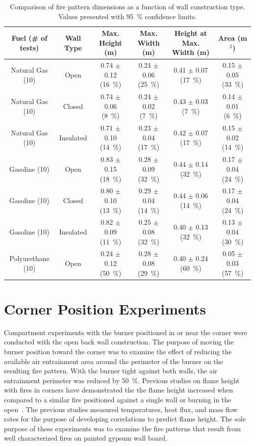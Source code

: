 \documentclass[twoside]{uocthesis}
\begin{document}
{\begin{table}
	\centering
	\footnotesize
	\begin{tabular}{|c|c|c|c|c|c|}
	\hline
	Fuel (\# of tests)      &   Wall Type   &   Max. Height (m)	         & Max. Width (m)               &  Height at Max. Width (m) &  Area (m$^2$)  \\ \hline 
		Natural Gas (10)    &   Open 		& 0.74 	$\pm$ 0.12 (16~\%)   &	0.24 $\pm$ 0.06 (25~\%) 	& 0.41 $\pm$ 0.07 (17~\%)	& 0.15 $\pm$ 0.05 (33~\%) 	\\
		Natural Gas (10)    &   Closed 		& 0.74	$\pm$ 0.06 (8~\%)    &	0.24 $\pm$ 0.02 (7~\%) 		& 0.43 $\pm$ 0.03 (7~\%)  	& 0.14 $\pm$ 0.01 (6~\%) 	\\
		Natural Gas (10)    &   Insulated 	& 0.71	$\pm$ 0.10 (14~\%)   &	0.23 $\pm$ 0.04 (17~\%) 	& 0.42 $\pm$ 0.07 (17~\%) 	& 0.15 $\pm$ 0.02 (14~\%)  	\\
		Gasoline (10)       &   Open    	& 0.83	$\pm$ 0.15 (18~\%)   &	0.28 $\pm$ 0.09 (32~\%) 	& 0.44 $\pm$ 0.14 (32~\%) 	& 0.17 $\pm$ 0.04 (24~\%)  	\\
		Gasoline (10)       &   Closed  	& 0.80	$\pm$ 0.10 (13~\%)   &	0.29 $\pm$ 0.04 (14~\%) 	& 0.44 $\pm$ 0.06 (14~\%) 	& 0.17 $\pm$ 0.04 (24~\%)  	\\
		Gasoline (10)       &   Insulated	& 0.82 	$\pm$ 0.09 (11~\%)   &	0.25 $\pm$ 0.08 (32~\%) 	& 0.40 $\pm$ 0.13 (32~\%) 	& 0.13 $\pm$ 0.04 (30~\%)  	\\
		Polyurethane (10)	&   Open 		& 0.24  $\pm$ 0.12 (50~\%) 	 &  0.28 $\pm$ 0.08 (29~\%) 	& 0.40 $\pm$ 0.24 (60~\%)   & 0.05 $\pm$ 0.03 (57~\%)   \\
		\hline
	\end{tabular}
	\caption[Comparison of fire pattern dimensions as a function of wall construction type]{Comparison of fire pattern dimensions as a function of wall construction type. Values presented with 95~\% confidence limits.}
	\label{tab:Fire_Pattern_Dimensions_Wall_Construction}
\end{table}

\section{Corner Position Experiments}

Compartment experiments with the burner positioned in or near the corner were conducted with the open back wall construction.  The purpose of moving the burner position toward the corner was to examine the effect of reducing the available air entrainment area around the perimeter of the burner on the resulting fire pattern.  With the burner tight against both walls, the air entrainment perimeter was reduced by 50~\%. Previous studies on flame height with fires in corners have demonstrated the the flame height increased when compared to a similar fire positioned against a single wall or burning in the open~\cite{Poreh:1999,Saito:1993,Takahashi:1997,Kokkala:1993}.  The previous studies measured temperatures, heat flux, and mass flow rates for the purpose of developing correlations to predict flame height. The sole purpose of these experiments was to examine the fire patterns that result from well characterized fires on painted gypsum wall board.       

}
\end{document}
